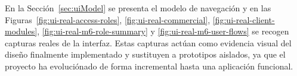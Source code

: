 En la Sección~\ref{sec:uiModel} se presenta el modelo de navegación y en las Figuras~\ref{fig:ui-real-access-roles}, \ref{fig:ui-real-commercial}, \ref{fig:ui-real-client-modules}, \ref{fig:ui-real-m6-role-summary} y \ref{fig:ui-real-m6-user-flows} se recogen capturas reales de la interfaz. Estas capturas actúan como evidencia visual del diseño finalmente implementado y sustituyen a prototipos aislados, ya que el proyecto ha evoluciónado de forma incremental hasta una aplicación funcional.
